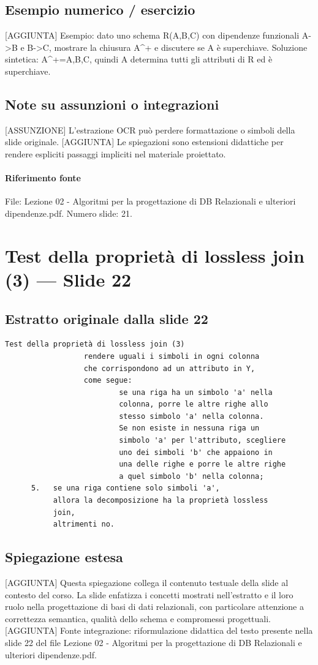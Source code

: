 \documentclass[11pt]{article}
\begin{document}
\subsection*{Esempio numerico / esercizio}
[AGGIUNTA] Esempio: dato uno schema R(A,B,C) con dipendenze funzionali A->B e B->C, mostrare la chiusura A^+ e discutere se A è superchiave. Soluzione sintetica: A^+={A,B,C}, quindi A determina tutti gli attributi di R ed è superchiave.
\subsection*{Note su assunzioni o integrazioni}
[ASSUNZIONE] L'estrazione OCR può perdere formattazione o simboli della slide originale.
[AGGIUNTA] Le spiegazioni sono estensioni didattiche per rendere espliciti passaggi impliciti nel materiale proiettato.
\paragraph{Riferimento fonte} File: Lezione 02 - Algoritmi per la progettazione di DB Relazionali e ulteriori dipendenze.pdf. Numero slide: 21.
\section{Test della proprietà di lossless join (3) --- Slide 22}
\subsection*{Estratto originale dalla slide 22}
\begin{lstlisting}
Test della proprietà di lossless join (3)
                  rendere uguali i simboli in ogni colonna
                  che corrispondono ad un attributo in Y,
                  come segue:
                          se una riga ha un simbolo 'a' nella
                          colonna, porre le altre righe allo
                          stesso simbolo 'a' nella colonna.
                          Se non esiste in nessuna riga un
                          simbolo 'a' per l'attributo, scegliere
                          uno dei simboli 'b' che appaiono in
                          una delle righe e porre le altre righe
                          a quel simbolo 'b' nella colonna;
      5.   se una riga contiene solo simboli 'a',
           allora la decomposizione ha la proprietà lossless
           join,
           altrimenti no.
\end{lstlisting}
\subsection*{Spiegazione estesa}
[AGGIUNTA] Questa spiegazione collega il contenuto testuale della slide al contesto del corso. La slide enfatizza i concetti mostrati nell'estratto e il loro ruolo nella progettazione di basi di dati relazionali, con particolare attenzione a correttezza semantica, qualità dello schema e compromessi progettuali.
[AGGIUNTA] Fonte integrazione: riformulazione didattica del testo presente nella slide 22 del file Lezione 02 - Algoritmi per la progettazione di DB Relazionali e ulteriori dipendenze.pdf.
\end{document}
